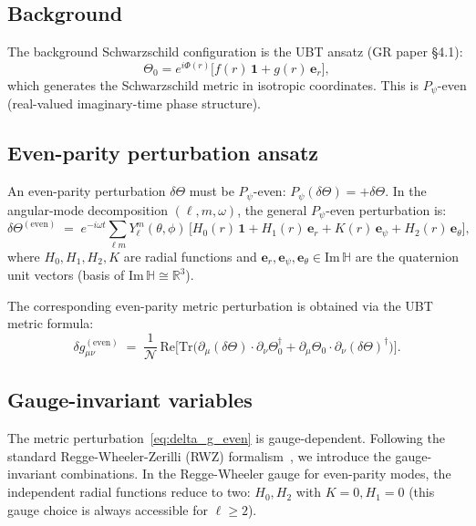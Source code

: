 \documentclass[12pt,a4paper]{article}
\theoremstyle{definition}
\theoremstyle{remark}
\newcommand{\HH}{\mathbb{H}}
\newcommand{\RR}{\mathbb{R}}
\newcommand{\Tr}{\mathrm{Tr}}
\newcommand{\re}{\mathrm{Re}}
\newcommand{\calN}{\mathcal{N}}
\begin{document}
\subsection{Background}

The background Schwarzschild configuration is the UBT ansatz
(GR paper §4.1):
\[
  \Theta_0 = e^{i\Phi(r)}\bigl[f(r)\,\mathbf{1} + g(r)\,\boldsymbol{e}_r\bigr],
\]
which generates the Schwarzschild metric in isotropic coordinates.
This is $P_\psi$-even (real-valued imaginary-time phase structure).

\subsection{Even-parity perturbation ansatz}

An even-parity perturbation $\delta\Theta$ must be $P_\psi$-even:
$P_\psi(\delta\Theta) = +\delta\Theta$.
In the angular-mode decomposition $(\ell, m, \omega)$, the general
$P_\psi$-even perturbation is:
\begin{equation}
\label{eq:dTheta_even}
  \delta\Theta^{(\mathrm{even})}
  \;=\;
  e^{-i\omega t}\sum_{\ell m} Y_\ell^m(\theta,\phi)\,
  \bigl[H_0(r)\,\mathbf{1}
        + H_1(r)\,\boldsymbol{e}_r
        + K(r)\,\boldsymbol{e}_\psi
        + H_2(r)\,\boldsymbol{e}_\theta\bigr],
\end{equation}
where $H_0, H_1, H_2, K$ are radial functions and
$\boldsymbol{e}_r, \boldsymbol{e}_\psi, \boldsymbol{e}_\theta \in \mathrm{Im}\,\HH$
are the quaternion unit vectors (basis of $\mathrm{Im}\,\HH \cong \RR^3$).

The corresponding even-parity metric perturbation is obtained via the UBT
metric formula:
\begin{equation}
\label{eq:delta_g_even}
  \delta g_{\mu\nu}^{(\mathrm{even})}
  \;=\;
  \frac{1}{\calN}\,\re\bigl[\Tr\bigl(\partial_\mu(\delta\Theta)\cdot\partial_\nu\Theta_0^\dagger
    + \partial_\mu\Theta_0\cdot\partial_\nu(\delta\Theta)^\dagger\bigr)\bigr].
\end{equation}

\subsection{Gauge-invariant variables}

The metric perturbation~\eqref{eq:delta_g_even} is gauge-dependent.
Following the standard Regge-Wheeler-Zerilli (RWZ) formalism~\cite{regge_wheeler1957,zerilli1970},
we introduce the gauge-invariant combinations.  In the Regge-Wheeler gauge for
even-parity modes, the independent radial functions reduce to two:
$H_0, H_2$ with $K = 0, H_1 = 0$ (this gauge choice is always accessible
for $\ell \geq 2$).
\end{document}

